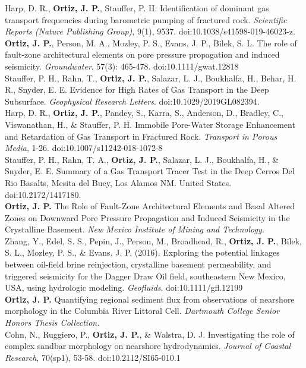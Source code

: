\documentclass[11pt, letterpaper]{article}
\newcommand{\years}[1]{\marginnote{\scriptsize #1}}
\begin{document}
\years{2019}Harp, D. R., \textbf{Ortiz, J. P.}, Stauffer, P. H. Identification
of dominant gas transport frequencies during barometric pumping of fractured
rock. \emph{Scientific Reports (Nature Publishing Group)}, 9(1), 9537.
doi:10.1038/s41598-019-46023-z. \\ 
\years{2019}\textbf{Ortiz, J. P.}, Person,
M. A., Mozley, P. S., Evans, J. P., Bilek, S. L. The role of fault-zone
architectural elements on pore pressure propagation and induced seismicity.
\emph{Groundwater}, 57(3): 465-478. doi:10.1111/gwat.12818\\
\years{2019}Stauffer, P. H., Rahn, T., \textbf{Ortiz, J. P.}, Salazar, L. J.,
Boukhalfa, H., Behar, H. R., Snyder, E. E. Evidence for High Rates of Gas
Transport in the Deep Subsurface. \emph{Geophysical Research Letters}.
doi:10.1029/2019GL082394.\\ 
\years{2018}Harp, D. R., \textbf{Ortiz, J. P.},
Pandey, S., Karra, S., Anderson, D., Bradley, C., Viswanathan, H., \& Stauffer,
P. H. Immobile Pore-Water Storage Enhancement and Retardation of Gas Transport
in Fractured Rock. \emph{Transport in Porous Media}, 1-26.
doi:10.1007/s11242-018-1072-8\\ 
\years{2018}Stauffer, P. H., Rahn, T. A.,
\textbf{Ortiz, J. P.}, Salazar, L. J., Boukhalfa, H., \& Snyder, E. E. Summary
of a Gas Transport Tracer Test in the Deep Cerros Del Rio Basalts, Mesita del
Buey, Los Alamos NM. United States. doi:10.2172/1417180.\\
\years{2017}\textbf{Ortiz, J. P.} The Role of Fault-Zone Architectural Elements
and Basal Altered Zones on Downward Pore Pressure Propagation and Induced
Seismicity in the Crystalline Basement. \emph{New Mexico Institute of Mining
and Technology.}\\ 
\years{2016}Zhang, Y., Edel, S. S., Pepin, J., Person, M.,
Broadhead, R., \textbf{Ortiz, J. P.}, Bilek, S. L., Mozley, P. S., \& Evans, J.
P. (2016). Exploring the potential linkages between oil-field brine
reinjection, crystalline basement permeability, and triggered seismicity for
the Dagger Draw Oil field, southeastern New Mexico, USA, using hydrologic
modeling. \emph{Geofluids}. doi:10.1111/gfl.12199\\
\years{2014}\textbf{Ortiz, J. P.} Quantifying regional sediment flux from
observations of nearshore morphology in the Columbia River Littoral Cell.
\emph{Dartmouth College Senior Honors Thesis Collection.}\\ 
\years{2014}Cohn, N., Ruggiero, P., \textbf{Ortiz, J. P.}, \& Walstra, D. J.
Investigating the role of complex sandbar morphology on nearshore
hydrodynamics. \emph{Journal of Coastal Research}, 70(sp1), 53-58.
doi:10.2112/SI65-010.1
\end{document}

